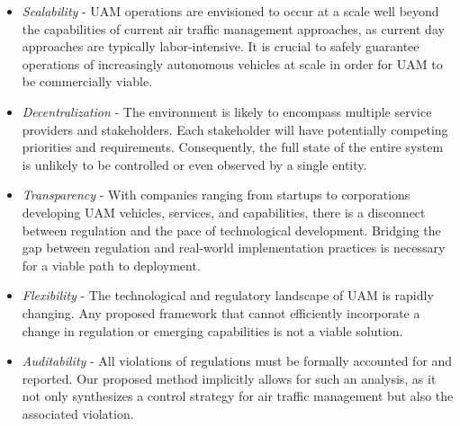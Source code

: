 \begin{itemize}
    \item \emph{Scalability} - UAM operations are envisioned to occur at a scale well beyond the capabilities of current air traffic management approaches, as current day approaches are typically labor-intensive. It is crucial to safely guarantee operations of increasingly autonomous vehicles at scale in order for UAM to be commercially viable. 
    
    \item \emph{Decentralization} - The environment is likely to encompass multiple service providers and stakeholders. Each stakeholder will have potentially competing priorities and requirements. Consequently, the full state of the entire system is unlikely to be controlled or even observed by a single entity.
    
    \item \emph{Transparency} - With companies ranging from startups to corporations developing UAM vehicles, services, and capabilities, there is a disconnect between regulation and the pace of technological development. Bridging the gap between regulation and real-world implementation practices is necessary for a viable path to deployment. 
    
    \item \emph{Flexibility} - The technological and regulatory landscape of UAM is rapidly changing. Any proposed framework that cannot efficiently incorporate a change in regulation or emerging capabilities is not a viable solution. 
    
    \item \emph{Auditability} - All violations of regulations must be formally accounted for and reported. Our proposed method implicitly allows for such an analysis, as it not only synthesizes a control strategy for air traffic management but also the associated violation. 
    
    \end{itemize}


